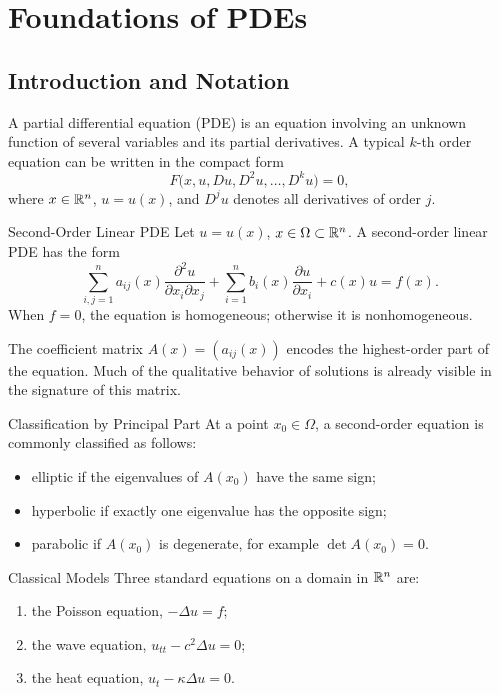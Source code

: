 
\chapter{Foundations of PDEs}

\section{Introduction and Notation}

A partial differential equation (PDE) is an equation involving an unknown function of several variables and its partial derivatives. A typical \(k\)-th order equation can be written in the compact form
\[
  F\bigl(x,u,Du,D^2u,\ldots,D^k u\bigr)=0,
\]
where \(x\in \mathbb{R}^n\), \(u=u(x)\), and \(D^j u\) denotes all derivatives of order \(j\).

\begin{definitionbox}{Second-Order Linear PDE}
Let \(u=u(x)\), \(x\in \Omega\subset\mathbb{R}^n\). A second-order linear PDE has the form
\[
  \sum_{i,j=1}^{n} a_{ij}(x)\frac{\partial^2 u}{\partial x_i\partial x_j}
  + \sum_{i=1}^{n} b_i(x)\frac{\partial u}{\partial x_i}
  + c(x)u = f(x).
\]
When \(f=0\), the equation is homogeneous; otherwise it is nonhomogeneous.
\end{definitionbox}

The coefficient matrix \(A(x)=(a_{ij}(x))\) encodes the highest-order part of the equation. Much of the qualitative behavior of solutions is already visible in the signature of this matrix.

\begin{definitionbox}{Classification by Principal Part}
At a point \(x_0\in\Omega\), a second-order equation is commonly classified as follows:
\begin{itemize}[leftmargin=2em]
  \item elliptic if the eigenvalues of \(A(x_0)\) have the same sign;
  \item hyperbolic if exactly one eigenvalue has the opposite sign;
  \item parabolic if \(A(x_0)\) is degenerate, for example \(\det A(x_0)=0\).
\end{itemize}
\end{definitionbox}

\begin{examplebox}{Classical Models}
Three standard equations on a domain in \(\mathbb{R}^n\) are:
\begin{enumerate}[label=(\roman*),leftmargin=2.4em]
  \item the Poisson equation, \(-\Delta u=f\);
  \item the wave equation, \(u_{tt}-c^2\Delta u=0\);
  \item the heat equation, \(u_t-\kappa\Delta u=0\).
\end{enumerate}
\end{examplebox}

